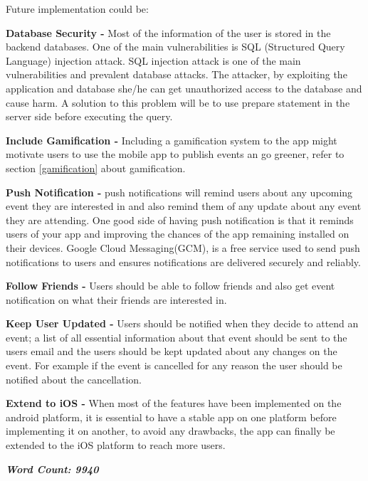 Future implementation could be:

\textbf{Database Security - }
Most of the information of the user is 
stored in the backend databases. One of the main vulnerabilities is SQL (Structured Query Language) injection attack. SQL injection attack is one of the main vulnerabilities and prevalent database attacks. The attacker,
by exploiting the application and database she/he can get unauthorized access to the 
database and cause harm. A solution to this problem will be to use prepare statement in the server side before 
executing the query.

\textbf{Include Gamification - }
Including a gamification system to the app might motivate users to use the mobile app to publish events an go greener, refer to section \ref{gamification} about gamification. 

\textbf{Push Notification - }
push notifications will remind users about any upcoming event they are interested in and also remind them of any update about any event they are attending. One good side of having push notification is that it reminds users of your app and improving the chances of the app remaining installed on their devices. Google Cloud Messaging(GCM), is a free service used to send push notifications to users and ensures notifications are delivered securely and reliably.

\textbf{Follow Friends - }
Users should be able to follow friends and also get event notification on what their friends are interested in. 

\textbf{Keep User Updated - }
Users should be notified when they decide to attend an event; a list of all essential information about that event should be sent to the users email and the users should be kept updated about any changes on the event. For example if the event is cancelled for any reason the user should be notified about the cancellation.

\textbf{Extend to iOS - }
When most of the features have been implemented on the android platform, it is essential to have a stable app on one platform before implementing it on another, to avoid any drawbacks, the app can finally be extended to the iOS platform to reach more users.

\textbf{\textit{Word Count: 9940}}
